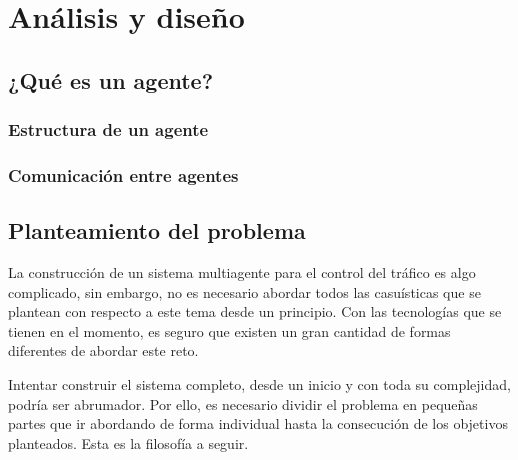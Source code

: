\chapter{Análisis y diseño}
    \label{chap:four}

\section{¿Qué es un agente?}
\subsection{Estructura de un agente}
\subsection{Comunicación entre agentes}


\newpage
\section{Planteamiento del problema}
    \label{section:problem}
La construcción de un sistema multiagente para el control del tráfico es algo complicado, sin embargo, no es necesario abordar todos las casuísticas que se plantean con respecto a este tema desde un principio. Con las tecnologías que se tienen en el momento, es seguro que existen un gran cantidad de formas diferentes de abordar este reto.

Intentar construir el sistema completo, desde un inicio y con toda su complejidad, podría ser abrumador. Por ello, es necesario dividir el problema en pequeñas partes que ir abordando de forma individual hasta la consecución de los objetivos planteados. Esta es la filosofía a seguir.

